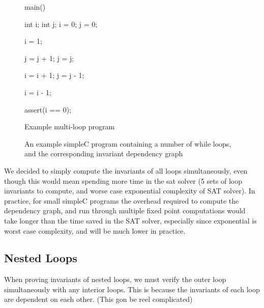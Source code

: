 \documentclass[11pt]{article}
\begin{document}
\begin{figure}[H]
\begin{center}
  \begin{minipage}[b]{.4\textwidth}
    \begin{algorithm}[H]
    main() {

    int i;
    int j;
    i = 0;
    j = 0;

     {
        i = 1;
    }

    {
       {
            j = j + 1;
        }
        j = j;

         {
            i = i + 1;
            j = j - 1;
        }
    }

     {
        i = i - 1;
    }

    assert(i == 0);
    }
    \caption{Example multi-loop program}
    \end{algorithm}
  \end{minipage}
  \quad \quad \quad \quad \quad \quad \quad \quad
  \begin{minipage}[H]{.3\textwidth}
    
  \end{minipage}
\end{center}
\caption{An example simpleC program containing a number of while loops, and the corresponding invariant dependency graph}
\end{figure}

We decided to simply compute the invariants of all loops simultaneously, even though this would mean spending more
time in the sat solver (5 sets of loop invariants to compute, and worse case exponential complexity of SAT solver).
In practice, for small simpleC programs the overhead required to compute the dependency graph, and run through multiple
fixed point computations would take longer than the time saved in the SAT solver, especially since exponential is worst
case complexity, and will be much lower in practice.

\subsection{Nested Loops}

When proving invariants of nested loops, we must verify the outer loop simultaneously with any interior loops. This is because the invariants of each loop are dependent on each other. (This gon be reel complicated)
\end{document}
